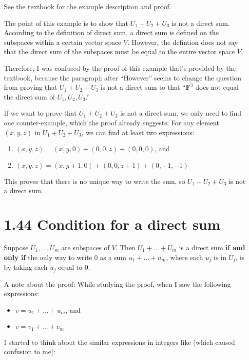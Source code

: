 \documentclass[12pt, letterpaper, oneside]{book}
\begin{document}
See the textbook for the example description and proof.

The point of this example is to show that $U_1 + U_2 + U_3$ is not a direct
sum. According to the definition of direct sum, a direct sum is defined on the
subspaces within a certain vector space $V$. However, the defintion does not
say that the direct sum of the subspaces must be equal to the entire vector
space $V$.

Therefore, I was confused by the proof of this example that's provided by the
textbook, because the paragraph after ``However'' seems to change the question
from proving that $U_1 + U_2 + U_3$ is not a direct sum to that
``$\mathbf{F}^3$ does not equal the direct sum of $U_1, U_2, U_3$.''

If we want to prove that $U_1 + U_2 + U_3$ is not a direct sum, we only need to
find one counter-example, which the proof already suggests: For any element
$(x, y, z)$ in $U_1 + U_2 + U_3$, we can find at least two expressions:

\begin{enumerate}
  \item $(x, y, z) = (x, y, 0) + (0, 0, z) + (0, 0, 0)$, and
  \item $(x, y, z) = (x, y + 1, 0) + (0, 0, z + 1) + (0, -1, -1)$
\end{enumerate}

This proves that there is no unique way to write the sum, so $U_1 + U_2 + U_3$
is not a direct sum.

\section{1.44 Condition for a direct sum}

Suppose $U_1, \ldots, U_m$ are subspaces of $V$. Then $U_1 + \ldots + U_m$ is a
direct sum \textbf{if and only if} the only way to write $0$ as a sum $u_1 +
\ldots + u_m$, where each $u_j$ is in $U_j$, is by taking each $u_j$ equal to 0.

A note about the proof: While studying the proof, when I saw the following
expressions:

\begin{itemize}
  \item $v = u_1 + \ldots + u_m$, and
  \item $v = v_1 + \ldots + v_m$
\end{itemize}

I started to think about the similar expressions in integers like (which caused
confusion to me):
\end{document}
